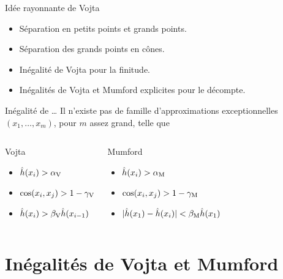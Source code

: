 \documentclass{mpg-thslides}
\begin{document}
\begin{frame}{Idée rayonnante de Vojta}
  \begin{itemize}
    \item Séparation en petits points et grands points.
    \item Séparation des grands points en cônes.
    \item Inégalité de Vojta pour la finitude.
    \item Inégalités de Vojta et Mumford explicites pour le décompte.
  \end{itemize}
  \begin{block}{Inégalité de \dots}
    Il n'existe pas de famille d'approximations exceptionnelles \( (x_1,
      \dots, x_m) \), pour \( m \) assez grand, telle que
    \begin{columns}
      \begin{block}{Vojta}
        \begin{itemize}
          \item \( \hat h (x_i) > \alpha \sb{\mathrm{V}} \)
          \item \( \cos(x_i, x_j) > 1 - \gamma \sb{\mathrm{V}} \)
          \item \( \hat h (x_i) > \beta \sb{\mathrm{V}} \hat h (x_{i-1}) \)
        \end{itemize}
      \end{block}
      \begin{block}{Mumford}
        \begin{itemize}
          \item \( \hat h (x_i) > \alpha \sb{\mathrm{M}} \)
          \item \( \cos(x_i, x_j) > 1 - \gamma \sb{\mathrm{M}} \)
          \item \( \lvert \hat h (x_1) - \hat h (x_i) \rvert < \beta \sb{\mathrm{M}} \hat h (x_1) \)
        \end{itemize}
      \end{block}
    \end{columns}
  \end{block}
\end{frame}



\section[Inégalités]{Inégalités de Vojta et Mumford}
\tocsect
\end{document}
